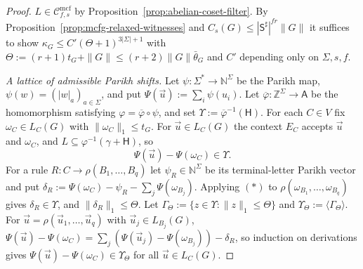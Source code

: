 \documentclass[11pt]{article}
\numberwithin{equation}{section}
\theoremstyle{plain}
\theoremstyle{definition}
\theoremstyle{remark}
\newcommand{\Cmcf}[2]{\mathcal{C}^{\mathrm{mcf}}_{#1,#2}}
\newcommand{\tuple}[1]{\vec{#1}}
\theoremstyle{plain}
\begin{document}
\begin{proof}
$L\in\Cmcf{f}{s}$ by Proposition~\ref{prop:abelian-coset-filter}.  By
Proposition~\ref{prop:mcfg-relaxed-witnesses} and
$C_s(G)\le|\mathsf S^\sharp|^{fr}\|G\|$ it suffices to show
$\kappa_G\le C'(\Theta+1)^{3|\Sigma|+1}$ with $\Theta:=(r+1)t_G+\|G\|\le(r+2)\|G\|\bar\theta_G$
and $C'$ depending only on $\Sigma,s,f$.

\emph{A lattice of admissible Parikh shifts.}  Let
$\psi:\Sigma^*\to\mathbb N^\Sigma$ be the Parikh map,
$\psi(w)=(|w|_a)_{a\in\Sigma}$, and put
$\Psi(\tuple u):=\sum_i\psi(u_i)$.  Let
$\overline\varphi:\mathbb Z^\Sigma\to\mathsf A$ be the homomorphism
satisfying $\varphi=\overline\varphi\circ\psi$, and set
$\Upsilon:=\overline\varphi^{-1}(\mathsf H)$.  For each $C\in V$ fix
$\omega_C\in L_C(G)$ with $\|\omega_C\|_1\le t_G$.  For $\tuple u\in L_C(G)$ the
context $E_C$ accepts $\tuple u$ and $\omega_C$, and $L\subseteq\varphi^{-1}(\gamma+\mathsf H)$,
so
\[
 \Psi(\tuple u)-\Psi(\omega_C)\in\Upsilon.\tag{$*$}
\]
For a rule $R:C\to\rho(B_1,\ldots,B_q)$ let $\psi_R\in\mathbb N^\Sigma$
be its terminal-letter Parikh vector and put
$\delta_R:=\Psi(\omega_C)-\psi_R-\sum_j\Psi(\omega_{B_j})$.  Applying $(*)$ to
$\rho(\omega_{B_1},\ldots,\omega_{B_q})$ gives $\delta_R\in\Upsilon$, and
$\|\delta_R\|_1\le \Theta$.  Let $\Gamma_\Theta:=\{z\in\Upsilon:\|z\|_1\le \Theta\}$ and
$\Upsilon_\Theta:=\langle\Gamma_\Theta\rangle$.  For $\tuple u=\rho(\tuple u_1,\ldots,\tuple u_q)$
with $\tuple u_j\in L_{B_j}(G)$,
$\Psi(\tuple u)-\Psi(\omega_C)=\sum_j(\Psi(\tuple u_j)-\Psi(\omega_{B_j}))-\delta_R$,
so induction on derivations gives $\Psi(\tuple u)-\Psi(\omega_C)\in\Upsilon_\Theta$ for all
$\tuple u\in L_C(G)$.


\end{proof}
\end{document}

